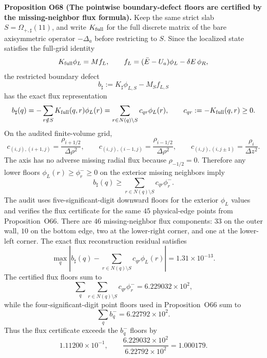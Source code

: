 \documentclass[aps,prd,onecolumn,notitlepage,nofootinbib,superscriptaddress,11pt,floatfix]{revtex4-2}
\begin{document}
\medskip\noindent\textbf{Proposition O68 (The pointwise boundary-defect floors are certified by the missing-neighbor flux formula).}
Keep the same strict slab \(S=\Omega_{+,\sharp}(11)\), and write \(K_{\rm full}\) for the full discrete matrix of the bare axisymmetric operator \(-\Delta_a\) before restricting to \(S\).  Since the localized state satisfies the full-grid identity
\[
K_{\rm full}\phi_L=M f_L,
\qquad
f_L=(\bar E-U_a)\phi_L-\delta E\,\phi_R,
\]
the restricted boundary defect
\[
b_\sharp:=K_\sharp\phi_{L,S}-M_S f_{L,S}
\]
has the exact flux representation
\[
b_\sharp(q)
=
-\sum_{r\notin S}K_{\rm full}(q,r)\phi_L(r)
=
\sum_{r\in N(q)\setminus S}c_{qr}\phi_L(r),
\qquad
c_{qr}:=-K_{\rm full}(q,r)\ge0.
\]
On the audited finite-volume grid,
\[
c_{(i,j),(i+1,j)}=\frac{\rho_{i+1/2}}{\Delta\rho^2},
\qquad
c_{(i,j),(i-1,j)}=\frac{\rho_{i-1/2}}{\Delta\rho^2},
\qquad
c_{(i,j),(i,j\pm1)}=\frac{\rho_i}{\Delta z^2}.
\]
The axis has no adverse missing radial flux because \(\rho_{-1/2}=0\).  Therefore any lower floors \(\phi_L(r)\ge\phi_r^-\ge0\) on the exterior missing neighbors imply
\[
b_\sharp(q)\ge
\sum_{r\in N(q)\setminus S}c_{qr}\phi_r^-.
\]
The audit
uses five-significant-digit downward floors for the exterior \(\phi_L\) values and verifies the flux certificate for the same \(45\) physical-edge points from Proposition~O66.  There are \(46\) missing-neighbor flux components: \(33\) on the outer wall, \(10\) on the bottom edge, two at the lower-right corner, and one at the lower-left corner.  The exact flux reconstruction residual satisfies
\[
\max_q
\left|
b_\sharp(q)-\sum_{r\in N(q)\setminus S}c_{qr}\phi_L(r)
\right|
=1.31\times10^{-13}.
\]
The certified flux floors sum to
\[
\sum_q\sum_{r\in N(q)\setminus S}c_{qr}\phi_r^-
=6.229032\times10^2,
\]
while the four-significant-digit point floors used in Proposition~O66 sum to
\[
\sum_q b_q^-=6.22792\times10^2.
\]
Thus the flux certificate exceeds the \(b_q^-\) floors by
\[
1.11200\times10^{-1},
\qquad
\frac{6.229032\times10^2}{6.22792\times10^2}=1.000179.
\]
\end{document}
